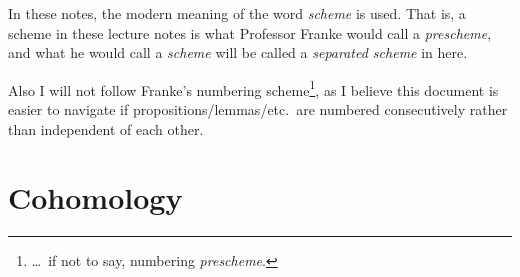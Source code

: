 \documentclass[a4paper, 10pt, oneside, DIV=9, chapterprefix=true, numbers=enddot, bibliography=totoc]{scrbook}
\DeclareRobustCommand{\Attention}{\tikz[baseline, anchor=base]\node[draw, regular polygon, regular polygon sides=3, rounded corners=2, thick, inner sep=-0.25pt] at (0,0) {\textbf{!}};}
\begin{document}
In these notes, the modern meaning of the word \emph{scheme} is used. That is, a scheme in these lecture notes is what Professor Franke would call a \emph{prescheme}, and what he would call a \emph{scheme} will be called a \emph{separated scheme} in here.

Also I will not follow Franke's numbering scheme\footnote{\ldots\ if not to say, numbering \emph{prescheme}.}, as I believe this document is easier to navigate if propositions/lemmas/etc.\ are numbered consecutively rather than independent of each other. 


\mainmatter{}



\chapter{Cohomology}
\end{document}
